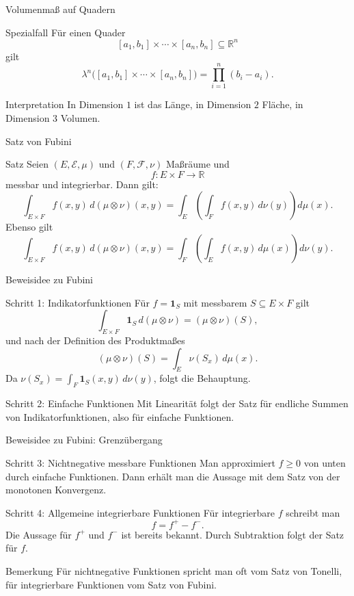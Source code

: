 \documentclass{beamer}
\begin{document}
\begin{frame}{Volumenmaß auf Quadern}
\begin{block}{Spezialfall}
Für einen Quader
\[
[a_1,b_1]\times\cdots\times[a_n,b_n]\subseteq\mathbb R^n
\]
gilt
\[
\lambda^n\bigl([a_1,b_1]\times\cdots\times[a_n,b_n]\bigr)
=
\prod_{i=1}^n (b_i-a_i).
\]
\end{block}

\begin{block}{Interpretation}
In Dimension \(1\) ist das Länge, in Dimension \(2\) Fläche, in Dimension \(3\) Volumen.
\end{block}
\end{frame}

\begin{frame}{Satz von Fubini}
\begin{block}{Satz}
Seien \((E,\mathcal E,\mu)\) und \((F,\mathcal F,\nu)\) Maßräume und
\[
f\colon E\times F\to\mathbb R
\]
messbar und integrierbar. Dann gilt:
\[
\int_{E\times F} f(x,y)\,d(\mu\otimes\nu)(x,y)
=
\int_E\left(\int_F f(x,y)\,d\nu(y)\right)d\mu(x).
\]
Ebenso gilt
\[
\int_{E\times F} f(x,y)\,d(\mu\otimes\nu)(x,y)
=
\int_F\left(\int_E f(x,y)\,d\mu(x)\right)d\nu(y).
\]
\end{block}
\end{frame}

\begin{frame}{Beweisidee zu Fubini}
\begin{block}{Schritt 1: Indikatorfunktionen}
Für \(f=\mathbf 1_S\) mit messbarem \(S\subseteq E\times F\) gilt
\[
\int_{E\times F}\mathbf 1_S\,d(\mu\otimes\nu)
=
(\mu\otimes\nu)(S),
\]
und nach der Definition des Produktmaßes
\[
(\mu\otimes\nu)(S)=\int_E \nu(S_x)\,d\mu(x).
\]
Da \(\nu(S_x)=\int_F \mathbf 1_S(x,y)\,d\nu(y)\), folgt die Behauptung.
\end{block}

\begin{block}{Schritt 2: Einfache Funktionen}
Mit Linearität folgt der Satz für endliche Summen von Indikatorfunktionen, also für einfache Funktionen.
\end{block}
\end{frame}

\begin{frame}{Beweisidee zu Fubini: Grenzübergang}
\begin{block}{Schritt 3: Nichtnegative messbare Funktionen}
Man approximiert \(f\ge 0\) von unten durch einfache Funktionen.
Dann erhält man die Aussage mit dem Satz von der monotonen Konvergenz.
\end{block}

\begin{block}{Schritt 4: Allgemeine integrierbare Funktionen}
Für integrierbare \(f\) schreibt man
\[
f=f^+-f^-.
\]
Die Aussage für \(f^+\) und \(f^-\) ist bereits bekannt.
Durch Subtraktion folgt der Satz für \(f\).
\end{block}

\begin{block}{Bemerkung}
Für nichtnegative Funktionen spricht man oft vom Satz von Tonelli, für integrierbare Funktionen vom Satz von Fubini.
\end{block}
\end{frame}
\end{document}
